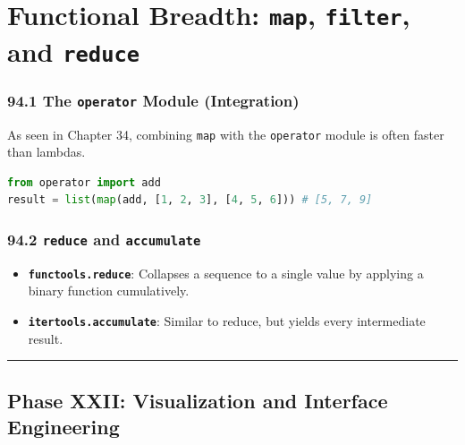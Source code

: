 \hypertarget{functional-breadth-map-filter-and-reduce}{%
\chapter{\texorpdfstring{Functional Breadth: \texttt{map},
\texttt{filter}, and
\texttt{reduce}}{Functional Breadth: map, filter, and reduce}}\label{functional-breadth-map-filter-and-reduce}}

\hypertarget{the-operator-module-integration}{%
\subsection{\texorpdfstring{94.1 The \texttt{operator} Module
(Integration)}{94.1 The operator Module (Integration)}}\label{the-operator-module-integration}}

As seen in Chapter 34, combining \passthrough{\lstinline!map!} with the
\passthrough{\lstinline!operator!} module is often faster than lambdas.

\begin{lstlisting}[language=Python]
from operator import add
result = list(map(add, [1, 2, 3], [4, 5, 6])) # [5, 7, 9]
\end{lstlisting}

\hypertarget{reduce-and-accumulate}{%
\subsection{\texorpdfstring{94.2 \texttt{reduce} and
\texttt{accumulate}}{94.2 reduce and accumulate}}\label{reduce-and-accumulate}}

\begin{itemize}
\tightlist
\item
  \textbf{\passthrough{\lstinline!functools.reduce!}}: Collapses a
  sequence to a single value by applying a binary function cumulatively.
\item
  \textbf{\passthrough{\lstinline!itertools.accumulate!}}: Similar to
  reduce, but yields every intermediate result.
\end{itemize}

\begin{center}\rule{0.5\linewidth}{0.5pt}\end{center}

\hypertarget{phase-xxii-visualization-and-interface-engineering}{%
\section{Phase XXII: Visualization and Interface
Engineering}\label{phase-xxii-visualization-and-interface-engineering}}

